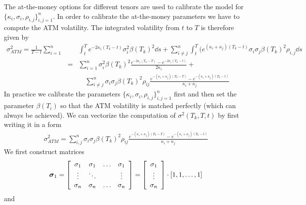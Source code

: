 \documentclass[12pt]{article}
\begin{document}
The at-the-money options for different tenors are 
used to calibrate the model for $\{ \kappa_i, \sigma_i, \rho_{i,j} \}_{i,j=1}^n $. 
In order to calibrate the at-the-money parameters we have to compute the ATM volatility. 
The integrated volatility from $t$ to $T$ is therefore given by 
\begin {eqnarray*} 
  \sigma_{ATM}^2 = \frac 1 {T-t} 
  \sum _{i=1}^n &  & \! \! \! \! \! \! \int_t^T e^{-2 \kappa_i (T_k - t) } \sigma_i^2 \beta (T_k)^2 \dd s 
  + \sum _{i\ne j}^n \int_t^T (e^{ (\kappa_i + \kappa_j) (T_k - t) } \sigma_i \sigma_j \beta (T_k)^2 
  \rho_{i,j} \dd s 
  \\
  & = & \sum_{i=1}^n \sigma_i^2 \beta(T_k)^2 \frac {  e^{-2 \kappa_i (T_k - T)} - e^{-2\kappa_i (T_k - t) } } 
    { 2 \kappa_i }  + 
    \\
    &  & \quad \sum_{i\ne j}^n \sigma_i \sigma_j \beta(T_k)^2 \rho_{ij} 
    \frac { e^{-(\kappa_i + \kappa_j ) (T_k - T)} - e^{-(\kappa_i + \kappa_j)(T_k - t) } } 
          {\kappa_i + \kappa_j } 
\end {eqnarray*} 
%
In practice we calibrate the parameters $\{ \kappa_i, \sigma_i, \rho_{i,j} \}_{i,j=1}^n $ 
first and then set the parameter $\beta (T_i)$ so that the ATM volatility is matched 
perfectly (which can always be achieved). 
\vskip 3mm
\noindent 
We can vectorize the computation of $\sigma^2 (T_k, T, t)$ by first writing it in a form 
\begin {eqnarray*} 
  \sigma_{ATM}^2 = 
  \sum_{i, j}^n \sigma_i \sigma_j \beta(T_k)^2 \rho_{ij} 
    \frac { e^{-(\kappa_i + \kappa_j ) (T_k - T)} - e^{-(\kappa_i + \kappa_j)(T_k - t) } } 
          {\kappa_i + \kappa_j } 
\end {eqnarray*} 
We first construct matrices 
\begin{eqnarray*}
  \mbox {\boldmath ${\sigma}$}_1 = \left[ \begin{array}{cccc}
      \sigma_1 & \sigma_1 & \ldots & \sigma_1 
      \\
      \vdots & \ddots & & \vdots 
      \\
      \sigma_n & \sigma_n & \ldots & \sigma_n
    \end{array} 
  \right]
  = \left[ \begin{array}{c}
      \sigma_1 
      \\
      \vdots 
      \\
      \sigma_n 
    \end{array} 
  \right]
  \cdot 
  \left[ 1, 1, \ldots , 1 \right]
\end{eqnarray*}
and 
\end{document}
